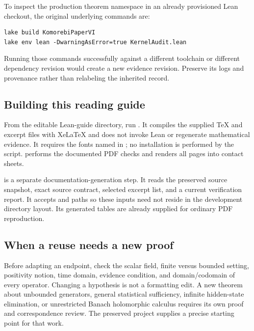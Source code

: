To inspect the production theorem namespace in an already provisioned Lean checkout, the original underlying commands are:
\begin{Verbatim}[fontsize=\small,frame=leftline,breaklines=true]
lake build KomorebiPaperVI
lake env lean -DwarningAsError=true KernelAudit.lean
\end{Verbatim}
Running those commands successfully against a different toolchain or different dependency revision would create a new evidence revision. Preserve its logs and provenance rather than relabeling the inherited record.

\subsection{Building this reading guide}
From the editable Lean-guide directory, run . It compiles the supplied TeX and excerpt files with XeLaTeX and does not invoke Lean or regenerate mathematical evidence. It requires the fonts named in ; no installation is performed by the script.  performs the documented PDF checks and renders all pages into contact sheets.

 is a separate documentation-generation step. It reads the preserved source snapshot, exact source contract, selected excerpt list, and a current verification report. It accepts  and  paths so these inputs need not reside in the development directory layout. Its generated tables are already supplied for ordinary PDF reproduction.

\subsection{When a reuse needs a new proof}
Before adapting an endpoint, check the scalar field, finite versus bounded setting, positivity notion, time domain, evidence condition, and domain/codomain of every operator. Changing a hypothesis is not a formatting edit. A new theorem about unbounded generators, general statistical sufficiency, infinite hidden-state elimination, or unrestricted Banach holomorphic calculus requires its own proof and correspondence review. The preserved project supplies a precise starting point for that work.
